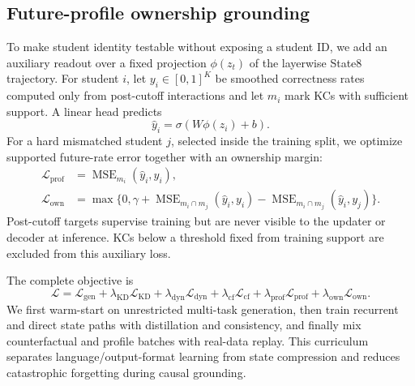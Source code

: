 \subsection{Future-profile ownership grounding}

To make student identity testable without exposing a student ID, we add an
auxiliary readout over a fixed projection $\phi(z_t)$ of the layerwise State8
trajectory.  For student $i$, let $y_i\in[0,1]^K$ be smoothed correctness rates
computed only from post-cutoff interactions and let $m_i$ mark KCs with
sufficient support.  A linear head predicts
\begin{equation}
    \hat y_i=\sigma(W\phi(z_i)+b).
\end{equation}
For a hard mismatched student $j$, selected inside the training split, we
optimize supported future-rate error together with an ownership margin:
\begin{align}
    \mathcal L_{\mathrm{prof}} &=
      \operatorname{MSE}_{m_i}(\hat y_i,y_i),\\
    \mathcal L_{\mathrm{own}} &=
      \max\{0,\gamma+
      \operatorname{MSE}_{m_i\cap m_j}(\hat y_i,y_i)-
      \operatorname{MSE}_{m_i\cap m_j}(\hat y_i,y_j)\}.
\end{align}
Post-cutoff targets supervise training but are never visible to the updater or
decoder at inference.  KCs below a threshold fixed from training support are
excluded from this auxiliary loss.

The complete objective is
\begin{equation}
    \mathcal L
      =\mathcal L_{\mathrm{gen}}
      +\lambda_{\mathrm{KD}}\mathcal L_{\mathrm{KD}}
      +\lambda_{\mathrm{dyn}}\mathcal L_{\mathrm{dyn}}
      +\lambda_{\mathrm{cf}}\mathcal L_{\mathrm{cf}}
      +\lambda_{\mathrm{prof}}\mathcal L_{\mathrm{prof}}
      +\lambda_{\mathrm{own}}\mathcal L_{\mathrm{own}}.
    \label{eq:total-loss}
\end{equation}
We first warm-start on unrestricted multi-task generation, then train recurrent
and direct state paths with distillation and consistency, and finally mix
counterfactual and profile batches with real-data replay.  This curriculum separates
language/output-format learning from state compression and reduces catastrophic
forgetting during causal grounding.
